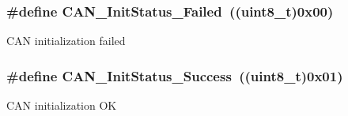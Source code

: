 \subsubsection[{C\+A\+N\+\_\+\+Init\+Status\+\_\+\+Failed}]{\setlength{\rightskip}{0pt plus 5cm}\#define C\+A\+N\+\_\+\+Init\+Status\+\_\+\+Failed~((uint8\+\_\+t)0x00)}\label{group___c_a_n___init_status_ga095c319e8c54c974eb2b6eeadf180d96}
C\+A\+N initialization failed \hypertarget{group___c_a_n___init_status_ga6bed5957af8f2f6b00568e15ccac5772}{}
\subsubsection[{C\+A\+N\+\_\+\+Init\+Status\+\_\+\+Success}]{\setlength{\rightskip}{0pt plus 5cm}\#define C\+A\+N\+\_\+\+Init\+Status\+\_\+\+Success~((uint8\+\_\+t)0x01)}\label{group___c_a_n___init_status_ga6bed5957af8f2f6b00568e15ccac5772}
C\+A\+N initialization O\+K 